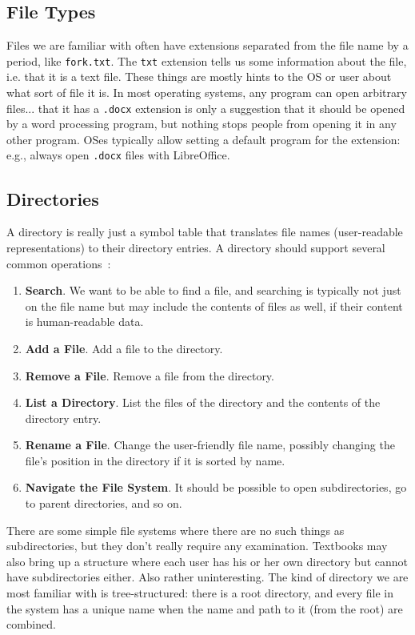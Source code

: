 \subsection*{File Types}

Files we are familiar with often have extensions separated from the file name by a period, like \texttt{fork.txt}. The \texttt{txt} extension tells us some information about the file, i.e. that it is a text file. These things are mostly hints to the OS or user about what sort of file it is. In most operating systems, any program can open arbitrary files... that it has a \texttt{.docx} extension is only a suggestion that it should be opened by a word processing program, but nothing stops people from opening it in any other program. OSes typically allow setting a default program for the extension: e.g., always open \texttt{.docx} files with LibreOffice.

\subsection*{Directories}

A directory is really just a symbol table that translates file names (user-readable representations) to their directory entries. A directory should support several common operations~\cite{osc}:

\begin{enumerate}
	\item \textbf{Search}. We want to be able to find a file, and searching is typically not just on the file name but may include the contents of files as well, if their content is human-readable data.
	\item \textbf{Add a File}. Add a file to the directory.
	\item \textbf{Remove a File}. Remove a file from the directory.
	\item \textbf{List a Directory}. List the files of the directory and the contents of the directory entry.
	\item \textbf{Rename a File}. Change the user-friendly file name, possibly changing the file's position in the directory if it is sorted by name.
	\item \textbf{Navigate the File System}. It should be possible to open subdirectories, go to parent directories, and so on.
\end{enumerate}

There are some simple file systems where there are no such things as subdirectories, but they don't really require any examination. Textbooks may also bring up a structure where each user has his or her own directory but cannot have subdirectories either. Also rather uninteresting. The kind of directory we are most familiar with is tree-structured: there is a root directory, and every file in the system has a unique name when the name and path to it (from the root) are combined.

